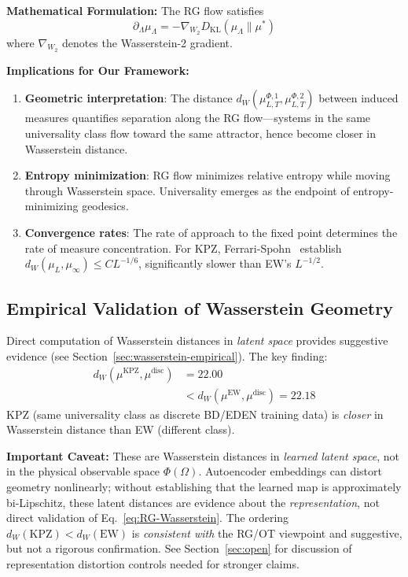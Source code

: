 \documentclass[aps,pre,reprint,amsmath,amssymb,superscriptaddress]{revtex4-2}
\newcommand{\EW}{\text{EW}}
\newcommand{\KPZ}{\text{KPZ}}
\begin{document}
\textbf{Mathematical Formulation:} The RG flow satisfies
\begin{equation}
\partial_\Lambda \mu_\Lambda = -\nabla_{W_2} D_{\text{KL}}(\mu_\Lambda \| \mu^*)
\label{eq:RG-Wasserstein}
\end{equation}
where $\nabla_{W_2}$ denotes the Wasserstein-2 gradient.

\textbf{Implications for Our Framework:}
\begin{enumerate}
\item \textbf{Geometric interpretation}: The distance $d_W(\mu^{\Phi,1}_{L,T}, \mu^{\Phi,2}_{L,T})$ between induced measures quantifies separation along the RG flow---systems in the same universality class flow toward the same attractor, hence become closer in Wasserstein distance.
\item \textbf{Entropy minimization}: RG flow minimizes relative entropy while moving through Wasserstein space. Universality emerges as the endpoint of entropy-minimizing geodesics.
\item \textbf{Convergence rates}: The rate of approach to the fixed point determines the rate of measure concentration. For KPZ, Ferrari-Spohn~\cite{FerrariSpohn2006} establish $d_W(\mu_L, \mu_\infty) \leq C L^{-1/6}$, significantly slower than EW's $L^{-1/2}$.
\end{enumerate}

\subsection{Empirical Validation of Wasserstein Geometry}

Direct computation of Wasserstein distances in \emph{latent space} provides suggestive evidence (see Section~\ref{sec:wasserstein-empirical}). The key finding:
\begin{align}
d_W(\mu^\KPZ, \mu^{\text{disc}}) &= 22.00 \nonumber\\
&< d_W(\mu^\EW, \mu^{\text{disc}}) = 22.18
\label{eq:wasserstein-empirical}
\end{align}
KPZ (same universality class as discrete BD/EDEN training data) is \emph{closer} in Wasserstein distance than EW (different class). 

\textbf{Important Caveat:} These are Wasserstein distances in \emph{learned latent space}, not in the physical observable space $\Phi(\Omega)$. Autoencoder embeddings can distort geometry nonlinearly; without establishing that the learned map is approximately bi-Lipschitz, these latent distances are evidence about the \emph{representation}, not direct validation of Eq.~\eqref{eq:RG-Wasserstein}. The ordering $d_W(\KPZ) < d_W(\EW)$ is \emph{consistent with} the RG/OT viewpoint and suggestive, but not a rigorous confirmation. See Section~\ref{sec:open} for discussion of representation distortion controls needed for stronger claims.
\end{document}

